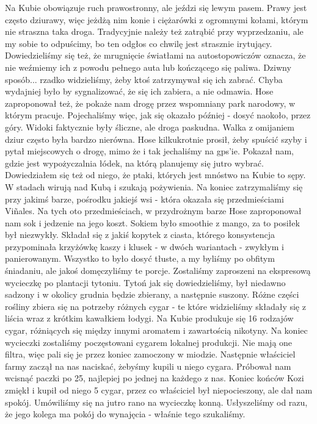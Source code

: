 Na Kubie obowiązuje ruch prawostronny, ale jeździ się lewym pasem.
Prawy jest często dziurawy, więc jeżdżą nim konie i ciężarówki z ogromnymi kołami, którym nie straszna taka droga.
Tradycyjnie należy też zatrąbić przy wyprzedzaniu, ale my sobie to odpuścimy, bo ten odgłos co chwilę jest strasznie irytujący.
Dowiedzieliśmy się też, że mrugnięcie światłami na autostopowiczów oznacza, że nie weźmiemy ich z powodu pełnego auta lub kończącego się paliwa.
Dziwny sposób...
rzadko widzieliśmy, żeby ktoś zatrzymywał się ich zabrać.
Chyba wydajniej było by sygnalizować, że się ich zabiera, a nie odmawia.
Hose zaproponował też, że pokaże nam drogę przez wspomniany park narodowy, w którym pracuje.
Pojechaliśmy więc, jak się okazało później - dosyć naokoło, przez góry.
Widoki faktycznie były śliczne, ale droga paskudna.
Walka z omijaniem dziur często była bardzo nierówna.
Hose kilkukrotnie prosił, żeby spuścić szyby i pytał miejscowych o drogę, mimo że i tak jechaliśmy na gps’ie.
Pokazał nam, gdzie jest wypożyczalnia łódek, na którą planujemy się jutro wybrać.
Dowiedziałem się też od niego, że ptaki, których jest mnóstwo na Kubie to sępy.
W stadach wirują nad Kubą i szukają pożywienia.
Na koniec zatrzymaliśmy się przy jakimś barze, pośrodku jakiejś wsi - która okazała się przedmieściami Viñales.
Na tych oto przedmieściach, w przydrożnym barze Hose zaproponował nam sok i jedzenie na jego koszt.
Sokiem było smoothie z mango, za to posiłek był niezwykły.
Składał się z jakiś kopytek z ciasta, którego konsystencja przypominała krzyżówkę kaszy i klusek - w dwóch wariantach - zwykłym i panierowanym.
Wszystko to było dosyć tłuste, a my byliśmy po obfitym śniadaniu, ale jakoś domęczyliśmy te porcje.
Zostaliśmy zaproszeni na ekspresową wycieczkę po plantacji tytoniu.
Tytoń jak się dowiedzieliśmy, był niedawno sadzony i w okolicy grudnia będzie zbierany, a następnie suszony.
Różne części rośliny zbiera się na potrzeby różnych cygar - te które widzieliśmy składały się z liścia wraz z krótkim kawałkiem łodygi.
Na Kubie produkuje się 16 rodzajów cygar, różniących się między innymi aromatem i zawartością nikotyny.
Na koniec wycieczki zostaliśmy poczęstowani cygarem lokalnej produkcji.
Nie mają one filtra, więc pali się je przez koniec zamoczony w miodzie.
Następnie właściciel farmy zaczął na nas naciskać, żebyśmy kupili u niego cygara.
Próbował nam wcisnąć paczki po 25, najlepiej po jednej na każdego z nas.
Koniec końców Kozi zmiękł i kupił od niego 5 cygar, przez co właściciel był niepocieszony, ale dał nam spokój.
Umówiliśmy się na jutro rano na wycieczkę konną.
Usłyszeliśmy od razu, że jego kolega ma pokój do wynajęcia - właśnie tego szukaliśmy.

